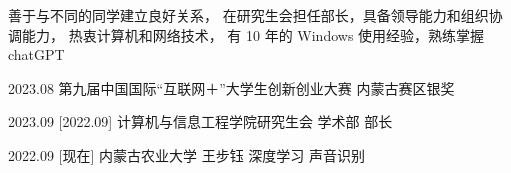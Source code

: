 \documentclass[zh]{resume}
\begin{document}
\makeheader

{\onehalfspacing\hspace{2em}%
善于与不同的同学建立良好关系，
在研究生会担任部长，具备领导能力和组织协调能力，
热衷计算机和网络技术，
有 10 年的 Windows 使用经验，熟练掌握chatGPT

\par}

\begin{competences}
\end{competences}

\begin{awards}
    \award
      {2023.08}
      {第九届中国国际“互联网＋”大学生创新创业大赛}
      {内蒙古赛区银奖}
      
    \separator{0.5ex}
    
    \study
      {2023.09}  %
      [2022.09]    %
      {计算机与信息工程学院研究生会}      %
      {学术部}  %
      {部长}       %
    \separator{0.5ex}


  \separator{0.5ex}
\end{awards}

\begin{educations}
  \education%
    {2022.09}%
    [现在]%
    {内蒙古农业大学}%
    {王步钰}%
    {深度学习}%
    {声音识别}

  \separator{0.5ex}
\end{educations}
\end{document}
